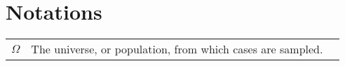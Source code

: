 
\chapter{Notations}

\begin{tabularx}{\textwidth}{ l X l }
$\Omega$ & The universe, or population, from which cases are sampled. & \pageref{ntn:omega} \\
\end{tabularx}
